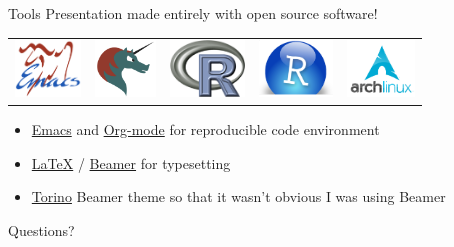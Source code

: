 \documentclass[sans,aspectratio=169,presentation,bigger,fleqn]{beamer}
\begin{document}
\begin{frame}[label=sec-24]{Tools}
Presentation made entirely with open source software!

\begin{center}
\begin{center}
\begin{tabular}{lllll}
\includegraphics[height=1.5cm]{./img/emacs.png} & \includegraphics[height=1.5cm]{./img/org-mode.png} & \includegraphics[height=1.5cm]{./img/r.png} & \includegraphics[height=1.5cm]{./img/r-studio.png} & \includegraphics[height=1.5cm]{./img/arch.png}\\
\end{tabular}
\end{center}
\end{center}

\begin{itemize}
\item \href{http://www.gnu.org/software/emacs/}{Emacs} and \href{http://orgmode.org/}{Org-mode} for reproducible code environment
\item \href{http://www.latex-project.org/}{\LaTeX} / \href{http://www.ctan.org/tex-archive/macros/latex/contrib/beamer/}{Beamer} for typesetting
\item \href{http://blog.barisione.org/2007-09/torino-a-pretty-theme-for-latex-beamer/}{Torino} Beamer theme so that it wasn't obvious I was using Beamer
\end{itemize}
\end{frame}

\begin{frame}[label=sec-25]{}
\LARGE
\begin{center}
Questions?
\end{center}
\end{frame}
\end{document}
